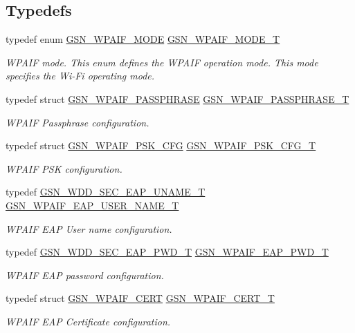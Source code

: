 \subsection*{Typedefs}
\begin{DoxyCompactItemize}
\item 
typedef enum \hyperlink{a00687_gaa611307c118e60b86fe3447c4dd9ef03}{GSN\_\-WPAIF\_\-MODE} \hyperlink{a00687_gafdd00105be3584713f485995fb16fc07}{GSN\_\-WPAIF\_\-MODE\_\-T}
\begin{DoxyCompactList}\small\item\em WPAIF mode. This enum defines the WPAIF operation mode. This mode specifies the Wi-\/Fi operating mode. \end{DoxyCompactList}\item 
typedef struct \hyperlink{a00424}{GSN\_\-WPAIF\_\-PASSPHRASE} \hyperlink{a00687_ga3cab0646203b96a6bc26d38587ecba02}{GSN\_\-WPAIF\_\-PASSPHRASE\_\-T}
\begin{DoxyCompactList}\small\item\em WPAIF Passphrase configuration. \end{DoxyCompactList}\item 
typedef struct \hyperlink{a00425}{GSN\_\-WPAIF\_\-PSK\_\-CFG} \hyperlink{a00687_ga76d386ef77db02abc848f5e9a50cd8e5}{GSN\_\-WPAIF\_\-PSK\_\-CFG\_\-T}
\begin{DoxyCompactList}\small\item\em WPAIF PSK configuration. \end{DoxyCompactList}\item 
typedef \hyperlink{a00290}{GSN\_\-WDD\_\-SEC\_\-EAP\_\-UNAME\_\-T} \hyperlink{a00687_ga0200d673ac133f30a5c4eb16fef8c3a4}{GSN\_\-WPAIF\_\-EAP\_\-USER\_\-NAME\_\-T}
\begin{DoxyCompactList}\small\item\em WPAIF EAP User name configuration. \end{DoxyCompactList}\item 
typedef \hyperlink{a00289}{GSN\_\-WDD\_\-SEC\_\-EAP\_\-PWD\_\-T} \hyperlink{a00687_gad6577531dfde003b7207ae0eb46aabee}{GSN\_\-WPAIF\_\-EAP\_\-PWD\_\-T}
\begin{DoxyCompactList}\small\item\em WPAIF EAP password configuration. \end{DoxyCompactList}\item 
typedef struct \hyperlink{a00421}{GSN\_\-WPAIF\_\-CERT} \hyperlink{a00687_ga00bd42b52d889cc88227a999dda345d9}{GSN\_\-WPAIF\_\-CERT\_\-T}
\begin{DoxyCompactList}\small\item\em WPAIF EAP Certificate configuration. \end{DoxyCompactList}\item 

\end{DoxyCompactItemize}
